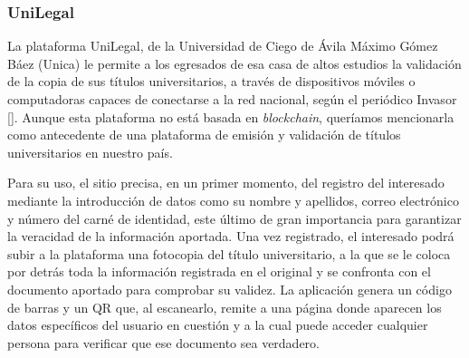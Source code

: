 
\subsubsection{UniLegal}
La plataforma UniLegal, de la Universidad de Ciego de Ávila Máximo Gómez Báez (Unica) le permite a los egresados de esa casa de altos estudios la validación de la copia de sus títulos universitarios, a través de dispositivos móviles o computadoras capaces de conectarse a la red nacional, según el periódico Invasor [\cite{90}]. Aunque esta plataforma no está basada en \textit{blockchain}, queríamos mencionarla como antecedente de una plataforma de emisión y validación de títulos universitarios en nuestro país.

Para su uso, el sitio precisa, en un primer momento, del registro del interesado mediante la introducción de datos como su nombre y apellidos, correo electrónico y número del carné de identidad, este último de gran importancia para garantizar la veracidad de la información aportada. Una vez registrado, el interesado podrá subir a la plataforma una fotocopia del título universitario, a la que se le coloca por detrás toda la información registrada en el original y se confronta con el documento aportado para comprobar su validez. La aplicación genera un código de barras y un QR que, al escanearlo, remite a una página donde aparecen los datos específicos del usuario en cuestión y a la cual puede acceder cualquier persona para verificar que ese documento sea verdadero.




